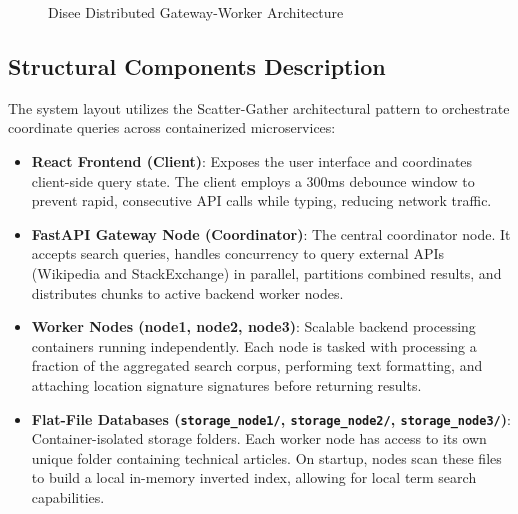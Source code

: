 \documentclass[11pt,a4paper]{article}
\begin{document}
\begin{figure}[h!]
\caption{Disee Distributed Gateway-Worker Architecture}
\label{fig:disee_architecture}
\end{figure}

\subsection{Structural Components Description}
The system layout utilizes the Scatter-Gather architectural pattern to orchestrate coordinate queries across containerized microservices:
\begin{itemize}
    \item \textbf{React Frontend (Client)}: Exposes the user interface and coordinates client-side query state. The client employs a 300ms debounce window to prevent rapid, consecutive API calls while typing, reducing network traffic.
    \item \textbf{FastAPI Gateway Node (Coordinator)}: The central coordinator node. It accepts search queries, handles concurrency to query external APIs (Wikipedia and StackExchange) in parallel, partitions combined results, and distributes chunks to active backend worker nodes.
    \item \textbf{Worker Nodes (node1, node2, node3)}: Scalable backend processing containers running independently. Each node is tasked with processing a fraction of the aggregated search corpus, performing text formatting, and attaching location signature signatures before returning results.
    \item \textbf{Flat-File Databases (\texttt{storage\_node1/}, \texttt{storage\_node2/}, \texttt{storage\_node3/})}: Container-isolated storage folders. Each worker node has access to its own unique folder containing technical articles. On startup, nodes scan these files to build a local in-memory inverted index, allowing for local term search capabilities.
\end{itemize}
\end{document}
